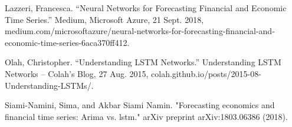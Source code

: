 \documentclass[12pt]{article}
\begin{document}
\begin{thebibliography}{9}

Lazzeri, Francesca. “Neural Networks for Forecasting Financial and Economic Time Series.” Medium, Microsoft Azure, 21 Sept. 2018, medium.com/microsoftazure/neural-networks-for-forecasting-financial-and-economic-time-series-6aca370ff412.

Olah, Christopher. “Understanding LSTM Networks.” Understanding LSTM Networks -- Colah's Blog, 27 Aug. 2015, colah.github.io/posts/2015-08-Understanding-LSTMs/.

Siami-Namini, Sima, and Akbar Siami Namin. "Forecasting economics and financial time series: Arima vs. lstm." arXiv preprint arXiv:1803.06386 (2018).


\end{thebibliography}
\end{document}

